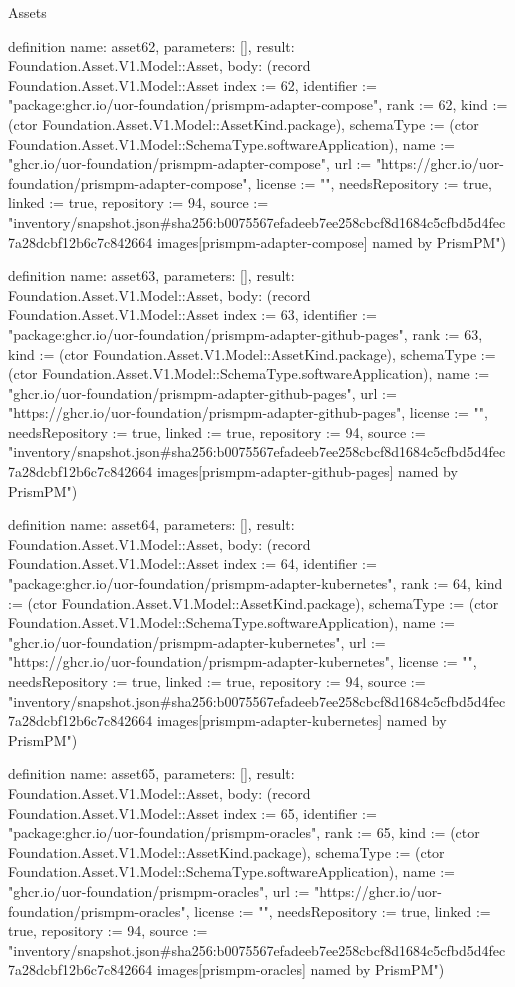 \begin{lexlean}{Assets}
\begin{semanticmodule}
definition{
  name: asset62,
  parameters: [],
  result: Foundation.Asset.V1.Model::Asset,
  body: (record Foundation.Asset.V1.Model::Asset {index := 62, identifier := "package:ghcr.io/uor-foundation/prismpm-adapter-compose", rank := 62, kind := (ctor Foundation.Asset.V1.Model::AssetKind.package), schemaType := (ctor Foundation.Asset.V1.Model::SchemaType.softwareApplication), name := "ghcr.io/uor-foundation/prismpm-adapter-compose", url := "https://ghcr.io/uor-foundation/prismpm-adapter-compose", license := "", needsRepository := true, linked := true, repository := 94, source := "inventory/snapshot.json#sha256:b0075567efadeeb7ee258cbcf8d1684c5cfbd5d4fec7a28dcbf12b6c7c842664 images[prismpm-adapter-compose] named by PrismPM"})
}

definition{
  name: asset63,
  parameters: [],
  result: Foundation.Asset.V1.Model::Asset,
  body: (record Foundation.Asset.V1.Model::Asset {index := 63, identifier := "package:ghcr.io/uor-foundation/prismpm-adapter-github-pages", rank := 63, kind := (ctor Foundation.Asset.V1.Model::AssetKind.package), schemaType := (ctor Foundation.Asset.V1.Model::SchemaType.softwareApplication), name := "ghcr.io/uor-foundation/prismpm-adapter-github-pages", url := "https://ghcr.io/uor-foundation/prismpm-adapter-github-pages", license := "", needsRepository := true, linked := true, repository := 94, source := "inventory/snapshot.json#sha256:b0075567efadeeb7ee258cbcf8d1684c5cfbd5d4fec7a28dcbf12b6c7c842664 images[prismpm-adapter-github-pages] named by PrismPM"})
}

definition{
  name: asset64,
  parameters: [],
  result: Foundation.Asset.V1.Model::Asset,
  body: (record Foundation.Asset.V1.Model::Asset {index := 64, identifier := "package:ghcr.io/uor-foundation/prismpm-adapter-kubernetes", rank := 64, kind := (ctor Foundation.Asset.V1.Model::AssetKind.package), schemaType := (ctor Foundation.Asset.V1.Model::SchemaType.softwareApplication), name := "ghcr.io/uor-foundation/prismpm-adapter-kubernetes", url := "https://ghcr.io/uor-foundation/prismpm-adapter-kubernetes", license := "", needsRepository := true, linked := true, repository := 94, source := "inventory/snapshot.json#sha256:b0075567efadeeb7ee258cbcf8d1684c5cfbd5d4fec7a28dcbf12b6c7c842664 images[prismpm-adapter-kubernetes] named by PrismPM"})
}

definition{
  name: asset65,
  parameters: [],
  result: Foundation.Asset.V1.Model::Asset,
  body: (record Foundation.Asset.V1.Model::Asset {index := 65, identifier := "package:ghcr.io/uor-foundation/prismpm-oracles", rank := 65, kind := (ctor Foundation.Asset.V1.Model::AssetKind.package), schemaType := (ctor Foundation.Asset.V1.Model::SchemaType.softwareApplication), name := "ghcr.io/uor-foundation/prismpm-oracles", url := "https://ghcr.io/uor-foundation/prismpm-oracles", license := "", needsRepository := true, linked := true, repository := 94, source := "inventory/snapshot.json#sha256:b0075567efadeeb7ee258cbcf8d1684c5cfbd5d4fec7a28dcbf12b6c7c842664 images[prismpm-oracles] named by PrismPM"})
}


\end{semanticmodule}
\end{lexlean}
